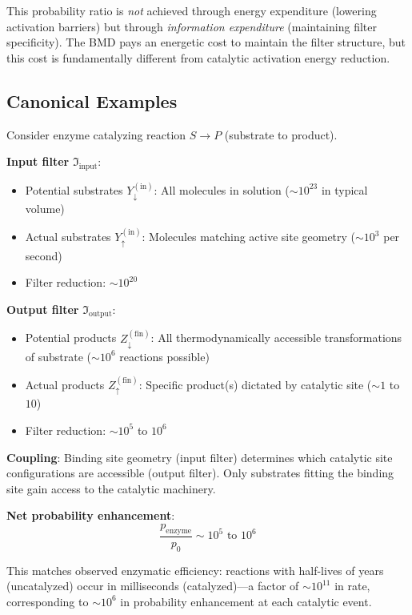 \begin{remark}
This probability ratio is \textit{not} achieved through energy expenditure (lowering activation barriers) but through \textit{information expenditure} (maintaining filter specificity). The BMD pays an energetic cost to maintain the filter structure, but this cost is fundamentally different from catalytic activation energy reduction.
\end{remark}

\subsection{Canonical Examples}

\begin{example}
\label{ex:enzyme_bmd}
Consider enzyme catalyzing reaction $S \to P$ (substrate to product).

\textbf{Input filter} $\Im_{\text{input}}$:
\begin{itemize}
\item Potential substrates $Y_{\downarrow}^{(\text{in})}$: All molecules in solution ($\sim 10^{23}$ in typical volume)
\item Actual substrates $Y_{\uparrow}^{(\text{in})}$: Molecules matching active site geometry ($\sim 10^3$ per second)
\item Filter reduction: $\sim 10^{20}$
\end{itemize}

\textbf{Output filter} $\Im_{\text{output}}$:
\begin{itemize}
\item Potential products $Z_{\downarrow}^{(\text{fin})}$: All thermodynamically accessible transformations of substrate ($\sim 10^6$ reactions possible)
\item Actual products $Z_{\uparrow}^{(\text{fin})}$: Specific product(s) dictated by catalytic site ($\sim 1$ to $10$)
\item Filter reduction: $\sim 10^5$ to $10^6$
\end{itemize}

\textbf{Coupling}: Binding site geometry (input filter) determines which catalytic site configurations are accessible (output filter). Only substrates fitting the binding site gain access to the catalytic machinery.

\textbf{Net probability enhancement}:
\begin{equation}
\frac{p_{\text{enzyme}}}{p_0} \sim 10^5 \text{ to } 10^6
\end{equation}

This matches observed enzymatic efficiency: reactions with half-lives of years (uncatalyzed) occur in milliseconds (catalyzed)—a factor of $\sim 10^{11}$ in rate, corresponding to $\sim 10^{6}$ in probability enhancement at each catalytic event.
\end{example}

